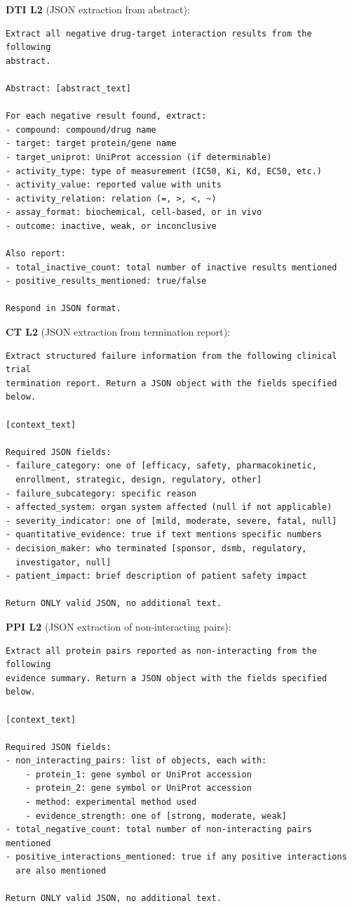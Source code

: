 \textbf{DTI L2} (JSON extraction from abstract):
\begin{small}
\begin{verbatim}
Extract all negative drug-target interaction results from the following
abstract.

Abstract: [abstract_text]

For each negative result found, extract:
- compound: compound/drug name
- target: target protein/gene name
- target_uniprot: UniProt accession (if determinable)
- activity_type: type of measurement (IC50, Ki, Kd, EC50, etc.)
- activity_value: reported value with units
- activity_relation: relation (=, >, <, ~)
- assay_format: biochemical, cell-based, or in vivo
- outcome: inactive, weak, or inconclusive

Also report:
- total_inactive_count: total number of inactive results mentioned
- positive_results_mentioned: true/false

Respond in JSON format.
\end{verbatim}
\end{small}

\textbf{CT L2} (JSON extraction from termination report):
\begin{small}
\begin{verbatim}
Extract structured failure information from the following clinical trial
termination report. Return a JSON object with the fields specified below.

[context_text]

Required JSON fields:
- failure_category: one of [efficacy, safety, pharmacokinetic,
  enrollment, strategic, design, regulatory, other]
- failure_subcategory: specific reason
- affected_system: organ system affected (null if not applicable)
- severity_indicator: one of [mild, moderate, severe, fatal, null]
- quantitative_evidence: true if text mentions specific numbers
- decision_maker: who terminated [sponsor, dsmb, regulatory,
  investigator, null]
- patient_impact: brief description of patient safety impact

Return ONLY valid JSON, no additional text.
\end{verbatim}
\end{small}

\textbf{PPI L2} (JSON extraction of non-interacting pairs):
\begin{small}
\begin{verbatim}
Extract all protein pairs reported as non-interacting from the following
evidence summary. Return a JSON object with the fields specified below.

[context_text]

Required JSON fields:
- non_interacting_pairs: list of objects, each with:
    - protein_1: gene symbol or UniProt accession
    - protein_2: gene symbol or UniProt accession
    - method: experimental method used
    - evidence_strength: one of [strong, moderate, weak]
- total_negative_count: total number of non-interacting pairs mentioned
- positive_interactions_mentioned: true if any positive interactions
  are also mentioned

Return ONLY valid JSON, no additional text.
\end{verbatim}
\end{small}


